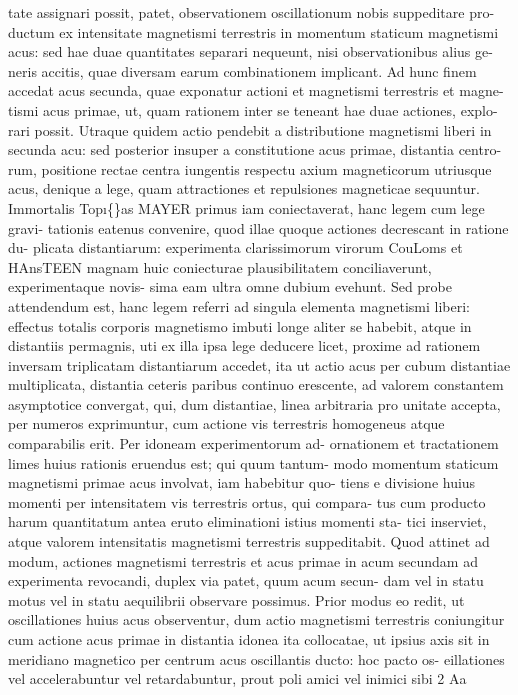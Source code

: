 \documentclass[12pt,a4paper]{article}
\begin{document}
tate assignari possit, patet, observationem oscillationum nobis suppeditare pro-
ductum ex intensitate magnetismi terrestris in momentum staticum magnetismi
acus: sed hae duae quantitates separari nequeunt, nisi observationibus alius ge-
neris accitis, quae diversam earum combinationem implicant.       Ad hunc finem
accedat acus secunda, quae exponatur actioni et magnetismi terrestris et magne-
tismi acus primae, ut, quam rationem inter se teneant hae duae actiones, explo-
rari possit. Utraque quidem actio pendebit a distributione magnetismi liberi in
secunda acu: sed posterior insuper a constitutione acus primae, distantia centro-
rum, positione rectae centra iungentis respectu axium magneticorum utriusque
acus, denique a lege, quam attractiones et repulsiones magneticae sequuntur.
Immortalis Top\i\{\}as MAYER primus iam coniectaverat, hanc legem cum lege gravi-
tationis eatenus convenire, quod illae quoque actiones decrescant in ratione du-
plicata distantiarum: experimenta clarissimorum virorum CouLoms et HAnsTEEN
magnam huic coniecturae plausibilitatem conciliaverunt, experimentaque novis-
sima eam ultra omne dubium evehunt.          Sed probe attendendum est, hanc legem
referri ad singula elementa magnetismi liberi: effectus totalis corporis magnetismo
imbuti longe aliter se habebit, atque in distantiis permagnis, uti ex illa ipsa lege
deducere licet, proxime ad rationem inversam triplicatam distantiarum accedet, ita
ut actio acus per cubum distantiae multiplicata, distantia ceteris paribus continuo
erescente, ad valorem constantem asymptotice convergat, qui, dum distantiae,
linea arbitraria pro unitate accepta, per numeros exprimuntur, cum actione vis
terrestris homogeneus atque comparabilis erit. Per idoneam experimentorum ad-
ornationem et tractationem limes huius rationis eruendus est; qui quum     tantum-
modo momentum staticum magnetismi primae acus involvat, iam habebitur quo-
tiens e divisione huius momenti per intensitatem vis terrestris ortus, qui compara-
tus cum producto harum quantitatum antea eruto eliminationi istius momenti sta-
tici inserviet, atque valorem intensitatis magnetismi terrestris suppeditabit.
Quod attinet ad modum, actiones magnetismi terrestris et acus primae in
acum secundam ad experimenta revocandi, duplex via patet, quum acum secun-
dam vel in statu motus vel in statu aequilibrii observare possimus.     Prior modus
eo redit, ut oscillationes huius acus observentur, dum actio magnetismi terrestris
coniungitur cum actione acus primae in distantia idonea ita collocatae, ut ipsius
axis sit in meridiano magnetico per centrum acus oscillantis ducto: hoc pacto os-
eillationes vel accelerabuntur vel retardabuntur, prout poli amici vel inimici sibi
2 Aa
\end{document}
